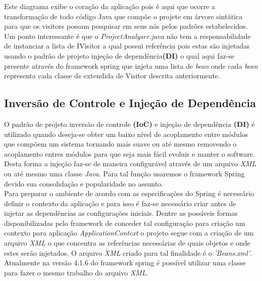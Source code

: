 Este diagrama exibe o coração da aplicação pois é aqui que ocorre a transformação de todo código Java que compõe o projete em árvore sintática para que os visitors\cite{Gamma:1995:DPE:186897} possam pesquisar em seus nós pelos padrões estabelecidos.\\

Um ponto interessante é que o \textit{ProjectAnalyser.java} não tem a responsabilidade de instanciar a lista de IVisitor a qual possui referência pois estas são injetadas usando o padrão de projeto injeção de dependência\textbf{(DI)} o qual aqui faz-se presente através do framework spring que injeta uma lista de \textit{bean} onde cada \textit{bean} representa cada classe de extendida de Visitor descrita anteriormente.\\

\clearpage


\subsection{Inversão de Controle e Injeção de Dependência}
O padrão de projeto inversão de controle \textbf{(IoC)} e injeção de dependência \textbf{(DI)} é utilizado quando deseja-se obter um baixo nível de acoplamento entre módulos que compõem um sistema tornando mais suave ou até mesmo removendo o acoplamento entres módulos para que seja mais fácil evoluir e manter o software. Desta forma a injeção faz-se de maneira configurável através de um arquivo \textit{XML} ou até mesmo uma classe \textit{Java}. Para tal função usaremos o framework Spring devido sua consolidação e popularidade no assunto.\\

Para preparar o ambiente de acordo com as especificações do Spring é necessário definir o contexto da aplicação e para isso é faz-se necessário criar antes de injetar as dependências as configurações iniciais. Dentre as possíveis formas disponibilizadas pelo framework de conceder tal configuração para criação um contexto para aplicação \textit{ApplicationContext} o projeto segue com a criação de um arquivo   \textit{XML} o que concentra as referências necessárias de quais objetos e onde estes serão injetados. O arquivo \textit{XML} criado para tal finalidade é o \textit{'Beans.xml'}. Atualmente na versão 4.1.6 do framework spring é possível utilizar uma classe para fazer o mesmo trabalho do arquivo \textit{XML}. \\

